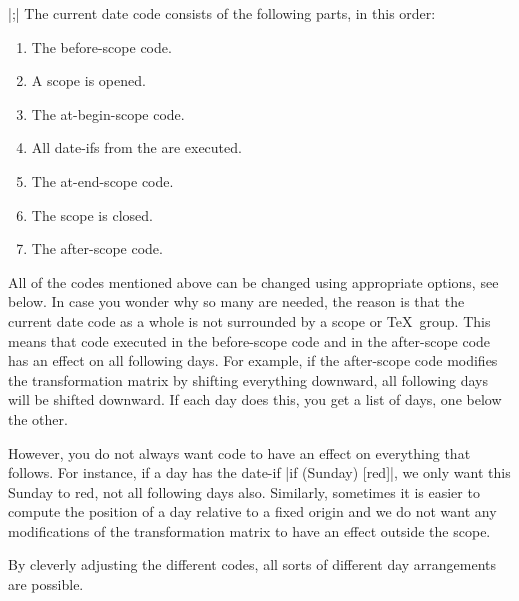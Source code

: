 \begin{command}{\calendar {}|;|}
  The current date code consists of the following parts, in this order:
  \begin{enumerate}
  \item The before-scope code.
  \item A scope is opened.
  \item The at-begin-scope code.
  \item All date-ifs from the  are
    executed.
  \item The at-end-scope code.
  \item The scope is closed.
  \item The after-scope code.
  \end{enumerate}
  All of the codes mentioned above can be changed using appropriate
  options, see below. In case you wonder why so many are needed, the
  reason is that the current date code as a whole is not
  surrounded by a scope or \TeX\ group. This means that code executed
  in the before-scope code and in the after-scope code has an effect
  on all following days. For example, if the after-scope code modifies
  the transformation matrix by shifting everything downward, all
  following days will be shifted downward. If each day does this, you
  get a list of days, one below the other.

  However, you do not always want code to have an effect on everything
  that follows. For instance, if a day has the date-if
  |if (Sunday) [red]|, we only want this Sunday to red, not all
  following days also. Similarly, sometimes it is easier to compute
  the position of a day relative to a fixed origin and we do not want
  any modifications of the transformation matrix to have an effect
  outside the scope.

  By cleverly adjusting the different codes, all sorts of different
  day arrangements are possible.


\end{command}
